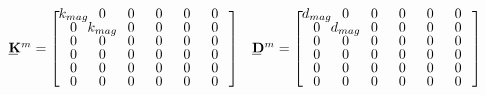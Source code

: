 \begin{equation*}
\def\cs{2em}
\begin{array}{cc}
\bunderline{\mathbf{K}}^m=\left[\def\arraystretch{.8}\arraycolsep=0pt\begin{array}{cccccc}
\makebox[\cs]{$k_{mag}$}&\makebox[\cs]{0}&\makebox[\cs]{0}&\makebox[\cs]{0}&\makebox[\cs]{0}&\makebox[\cs]{0}\\
0&k_{mag}&0&0&0&0\\
0&0&0&0&0&0\\
0&0&0&0&0&0\\
0&0&0&0&0&0\\
0&0&0&0&0&0
\end{array}\right] & \bunderline{\mathbf{D}}^m=\left[\def\arraystretch{.8}\arraycolsep=0pt\begin{array}{cccccc}
\makebox[\cs]{$d_{mag}$}&\makebox[\cs]{0}&\makebox[\cs]{0}&\makebox[\cs]{0}&\makebox[\cs]{0}&\makebox[\cs]{0}\\
0&d_{mag}&0&0&0&0\\
0&0&0&0&0&0\\
0&0&0&0&0&0\\
0&0&0&0&0&0\\
0&0&0&0&0&0
\end{array}\right]
\end{array}
\end{equation*}
